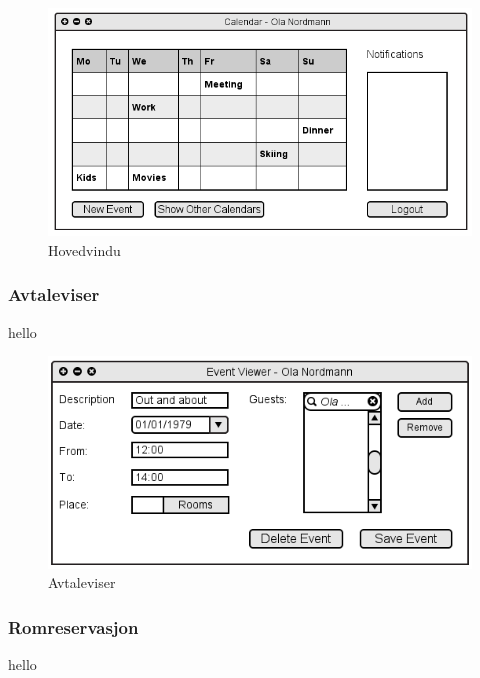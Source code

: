 \begin{figure}[H]
\centering
\includegraphics[scale=0.65]{images/hovedvindu.png}
\caption{Hovedvindu}
\label{hovedvindu_image}
\end{figure}

\subsubsection{Avtaleviser}
hello

\begin{figure}[H]
\centering
\includegraphics[scale=0.65]{images/avtaleviser.png}
\caption{Avtaleviser}
\label{avtaleviser_image}
\end{figure}

\subsubsection{Romreservasjon}
hello

